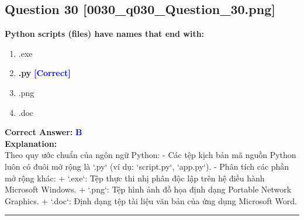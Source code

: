 \documentclass[11pt,a4paper]{article}
\begin{document}
\begin{minipage}{\textwidth}
\subsection*{Question 30 \quad \footnotesize{[0030_q030_Question_30.png]}}
\noindent \textbf{Python scripts (files) have names that end with:}

\begin{enumerate}[label=\Alph*.]
    \item .exe
    \item \textbf{.py} \hfill \textcolor{blue}{\textbf{[Correct]}}
    \item .png
    \item .doc
\end{enumerate}

\noindent \textbf{Correct Answer:} \textcolor{blue}{\textbf{B}} \\[4pt]
\noindent \textbf{Explanation:}\\
Theo quy ước chuẩn của ngôn ngữ Python:\newline
- Các tệp kịch bản mã nguồn Python luôn có đuôi mở rộng là `.py` (ví dụ: `script.py`, `app.py`).\newline
- Phân tích các phần mở rộng khác:\newline
  + `.exe`: Tệp thực thi nhị phân độc lập trên hệ điều hành Microsoft Windows.\newline
  + `.png`: Tệp hình ảnh đồ họa định dạng Portable Network Graphics.\newline
  + `.doc`: Định dạng tệp tài liệu văn bản của ứng dụng Microsoft Word.
\end{minipage}
\vspace{0.8cm}
\hrule
\vspace{0.5cm}
\end{document}
